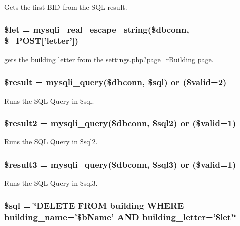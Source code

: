 \-Gets the first \-B\-I\-D from the \-S\-Q\-L result. \hypertarget{rmBuilding_8php_ac3687b5a21519c53f240b5d1c07f997a}{
\subsubsection[{\$let}]{\setlength{\rightskip}{0pt plus 5cm}\$let = mysqli\-\_\-real\-\_\-escape\-\_\-string(\$dbconn, \$\-\_\-\-P\-O\-S\-T\mbox{[}'letter'\mbox{]})}}\label{rmBuilding_8php_ac3687b5a21519c53f240b5d1c07f997a}
gets the building letter from the \hyperlink{settings_8php}{settings.\-php}?page=r\-Building page. \hypertarget{rmBuilding_8php_a112ef069ddc0454086e3d1e6d8d55d07}{
\subsubsection[{\$result}]{\setlength{\rightskip}{0pt plus 5cm}\$result = mysqli\-\_\-query(\$dbconn, \$sql) or (\$valid=2)}}\label{rmBuilding_8php_a112ef069ddc0454086e3d1e6d8d55d07}
\-Runs the \-S\-Q\-L \-Query in \$sql. \hypertarget{rmBuilding_8php_ae734ecc68847d4f436c60c39ec64af11}{
\subsubsection[{\$result2}]{\setlength{\rightskip}{0pt plus 5cm}\$result2 = mysqli\-\_\-query(\$dbconn, \$sql2) or (\$valid=1)}}\label{rmBuilding_8php_ae734ecc68847d4f436c60c39ec64af11}
\-Runs the \-S\-Q\-L \-Query in \$sql2. \hypertarget{rmBuilding_8php_a3bed351c02cbc07bce580e0044c8d37d}{
\subsubsection[{\$result3}]{\setlength{\rightskip}{0pt plus 5cm}\$result3 = mysqli\-\_\-query(\$dbconn, \$sql3) or (\$valid=1)}}\label{rmBuilding_8php_a3bed351c02cbc07bce580e0044c8d37d}
\-Runs the \-S\-Q\-L \-Query in \$sql3. \hypertarget{rmBuilding_8php_a047170d6020a882807665812a27e2525}{
\subsubsection[{\$sql}]{\setlength{\rightskip}{0pt plus 5cm}\$sql = \char`\"{}\-D\-E\-L\-E\-T\-E \-F\-R\-O\-M building \-W\-H\-E\-R\-E building\-\_\-name='\$b\-Name' \-A\-N\-D building\-\_\-letter='\$let'\char`\"{}}}\label{rmBuilding_8php_a047170d6020a882807665812a27e2525}
